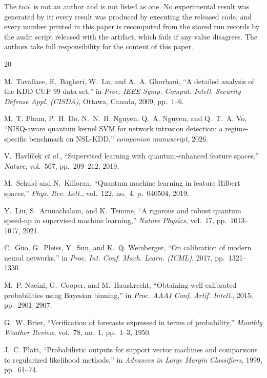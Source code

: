 \documentclass[journal]{IEEEtran}
\begin{document}
The tool is not an author and is not listed as one. No experimental result
was generated by it: every result was produced by executing the released
code, and every number printed in this paper is recomputed from the stored
run records by the audit script released with the artifact, which fails if
any value disagrees. The authors take full responsibility for the content of
this paper.

\begin{thebibliography}{20}

M.~Tavallaee, E.~Bagheri, W.~Lu, and A.~A. Ghorbani,
``A detailed analysis of the KDD CUP 99 data set,'' in
\emph{Proc. IEEE Symp. Comput. Intell. Security Defense Appl. (CISDA)},
Ottawa, Canada, 2009, pp.~1--6.

M.~T. Pham, P.~H. Do, N.~N.~H. Nguyen, Q.~A. Nguyen, and Q.~T.~A. Vo,
``NISQ-aware quantum kernel SVM for network intrusion detection: a
  regime-specific benchmark on NSL-KDD,'' \emph{companion manuscript},
  2026.

V.~Havl\'i\v{c}ek \emph{et al.},
``Supervised learning with quantum-enhanced feature spaces,''
\emph{Nature}, vol.~567, pp.~209--212, 2019.

M.~Schuld and N.~Killoran,
``Quantum machine learning in feature Hilbert spaces,''
\emph{Phys. Rev. Lett.}, vol.~122, no.~4, p.~040504, 2019.

Y.~Liu, S.~Arunachalam, and K.~Temme,
``A rigorous and robust quantum speed-up in supervised machine
  learning,'' \emph{Nature Physics}, vol.~17, pp.~1013--1017, 2021.

C.~Guo, G.~Pleiss, Y.~Sun, and K.~Q. Weinberger,
``On calibration of modern neural networks,'' in
\emph{Proc. Int. Conf. Mach. Learn. (ICML)}, 2017, pp.~1321--1330.

M.~P. Naeini, G.~Cooper, and M.~Hauskrecht,
``Obtaining well calibrated probabilities using Bayesian binning,''
in \emph{Proc. AAAI Conf. Artif. Intell.}, 2015, pp.~2901--2907.

G.~W. Brier,
``Verification of forecasts expressed in terms of probability,''
\emph{Monthly Weather Review}, vol.~78, no.~1, pp.~1--3, 1950.

J.~C. Platt,
``Probabilistic outputs for support vector machines and comparisons
  to regularized likelihood methods,'' in
\emph{Advances in Large Margin Classifiers}, 1999, pp.~61--74.


\end{thebibliography}
\end{document}
